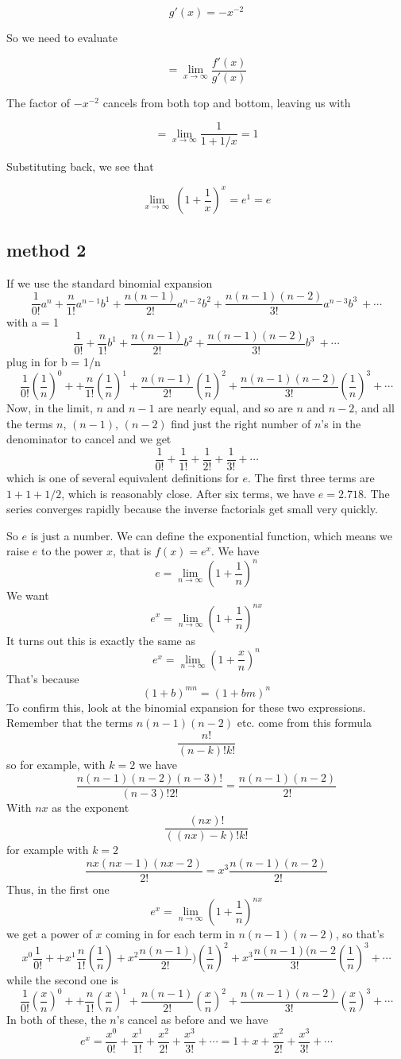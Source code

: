 \documentclass[11pt, oneside]{article}   	%
\begin{document}
\[ g'(x) = -x^{-2} \]

So we need to evaluate

\[ = \lim_{x \rightarrow \infty} \frac{f'(x)}{g'(x)} \]

The factor of $-x^{-2}$ cancels from both top and bottom, leaving us with

\[ = \lim_{x \rightarrow \infty} \frac{1}{1 + 1/x} = 1  \]

Substituting back, we see that

\[ \lim_{x \rightarrow \infty} \ (1 + \frac{1}{x})^x = e^1 = e \]


\subsection*{method 2}

If we use the standard binomial expansion
\[ \frac{1}{0!}a^n + \frac{n}{1!}a^{n-1}b^1 + \frac{n(n-1)}{2!}a^{n-2}b^2 + \frac{n(n-1)(n-2)}{3!}a^{n-3}b^3\ + \cdots \]
with a = 1
\[ \frac{1}{0!} + \frac{n}{1!}b^1 + \frac{n(n-1)}{2!}b^2 + \frac{n(n-1)(n-2)}{3!}b^3\ + \cdots \]
plug in for b = 1/n
\[ \frac{1}{0!}({\frac{1}{n}})^0 + + \frac{n}{1!}({\frac{1}{n}})^1 + \frac{n(n-1)}{2!}({\frac{1}{n}})^2 + \frac{n(n-1)(n-2)}{3!}({\frac{1}{n}})^3 + \cdots  \]
Now, in the limit, $n$ and $n-1$ are nearly equal, and so are $n$ and $n-2$, and all the terms $n$, $(n-1)$, $(n-2)$ find just the right number of $n$'s in the denominator to cancel and we get
\[ \frac{1}{0!} + \frac{1}{1!} + \frac{1}{2!} + \frac{1}{3!} + \cdots  \]
which is one of several equivalent definitions for $e$.  The first three terms are $1 + 1 + 1/2$, which is reasonably close. After six terms, we have $e = 2.718$.  The series converges rapidly because the inverse factorials get small very quickly.

So $e$ is just a number.  We can define the exponential function, which means we raise $e$ to the power $x$, that is $f(x) = e^x$.  We have
\[ e = \lim_{n \to \infty} (1 + \frac{1}{n})^{n} \]
We want 
\[ e^x = \lim_{n \to \infty} (1 + \frac{1}{n})^{nx} \]
It turns out this is exactly the same as
\[ e^x = \lim_{n \to \infty} (1 + \frac{x}{n})^{n} \]
That's because
\[ (1+b)^{mn} = (1+bm)^n \]
To confirm this, look at the binomial expansion for these two expressions.  Remember that the terms $n(n-1)(n-2)$ etc. come from this formula
\[ \frac{n!}{(n-k)!k!} \]
so for example, with $k=2$ we have
\[ \frac{n(n-1)(n-2)(n-3)!}{(n-3)!2!} = \frac{n(n-1)(n-2)}{2!} \]
With $nx$ as the exponent
\[ \frac{(nx)!}{((nx)-k)!k!} \]
for example with $k=2$
\[ \frac{nx(nx-1)(nx-2)}{2!} = x^3 \frac{n(n-1)(n-2)}{2!}\]
Thus, in the first one
\[ e^x = \lim_{n \to \infty} (1 + \frac{1}{n})^{nx} \]
we get a power of $x$ coming in for each term in $n(n-1)(n-2)$, so that's
\[ x^0 \frac{1}{0!} + + x^1 \frac{n}{1!}({\frac{1}{n}}) + x^2 \frac{n(n-1)}{2!})({\frac{1}{n}})^2 + x^3 \frac{n(n-1)(n-2}{3!}({\frac{1}{n}})^3 + \cdots  \]
while the second one is
\[ \frac{1}{0!}(\frac{x}{n})^0 + + \frac{n}{1!}({\frac{x}{n}})^1 + \frac{n(n-1)}{2!}({\frac{x}{n}})^2 + \frac{n(n-1)(n-2)}{3!}({\frac{x}{n}})^3 + \cdots  \]
In both of these, the $n$'s cancel as before and we have
\[ e^x = \frac{x^0}{0!} + \frac{x^1}{1!} + \frac{x^2}{2!} + \frac{x^3}{3!} + \cdots = 1 + x + \frac{x^2}{2!} + \frac{x^3}{3!} + \cdots  \]
\end{document}

